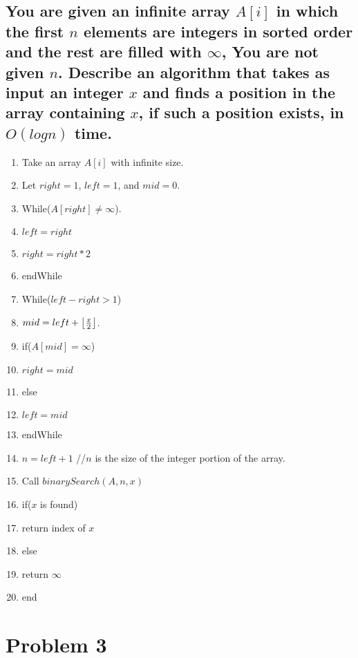 \documentclass{article}
\DeclarePairedDelimiter\floor{\lfloor}{\rfloor}
\begin{document}
\subsection*{You are given an infinite array $A[i]$ in which the first $n$ elements are integers in sorted order and the
rest are filled with $∞$, You are not given $n$. Describe an algorithm that takes as input an integer $x$ and finds
a position in the array containing $x$, if such a position exists, in $O(log n)$ time.}
	\begin{center}
        \begin{enumerate}
			\item Take an array $A[i]$ with infinite size.
            \item Let $right=1$, $left=1$, and $mid=0$.
            \item While($A[right] \neq ∞ $).
            \item 	$left=right$
            \item 	$right=right*2$
            \item endWhile
            \item While($left-right>1$)
            \item 	$mid=left+\floor*{\frac{x}{2}}$.
            \item 	if($A[mid]=∞$)
            \item 		$right=mid$
            \item	else
            \item		$left=mid$
            \item endWhile
            \item $n=left+1$			//$n$ is the size of the integer portion of the array.	
            \item Call $binarySearch(A, n, x)$
            \item if($x$ is found)
            \item	return index of $x$
            \item else
            \item 	return $∞$
            \item end
        \end{enumerate}
	\end{center}
\section*{Problem 3}
\end{document}
